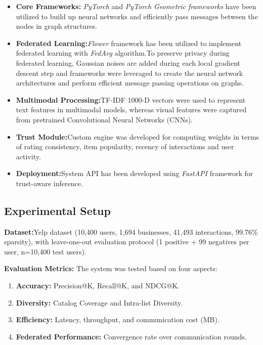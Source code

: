 \documentclass[journal]{IEEEtran} %
\begin{document}
\begin{itemize}
    \item \textbf{Core Frameworks:}
    \textit{PyTorch} and \textit{PyTorch Geometric frameworks} have been utilized to build up neural networks and efficiently pass messages between the nodes in graph structures.
    \item \textbf{Federated Learning:}\textit{Flower} framework has been utilized to implement federated learning with \textit{FedAvg} algorithm.To preserve privacy during federated learning, Gaussian noises are added during each local gradient descent step and  frameworks were leveraged to create the neural network architectures and perform efficient message passing operations on graphs.
    \item \textbf{Multimodal Processing:}TF-IDF 1000-D vectors were used to represent text features in multimodal models, whereas visual features were captured from pretrained Convolutional Neural Networks (CNNs).
    \item \textbf{Trust Module:}Custom engine was developed for computing weights in terms of rating consistency, item popularity, recency of interactions and user activity.
    \item \textbf{Deployment:}System API has been developed
    using \textit{FastAPI} framework for trust-aware inference.
    \end{itemize}

\subsection{Experimental Setup}

\textbf{Dataset:}Yelp dataset (10,400 users, 1,694 businesses, 41,493 interactions, 99.76\% sparsity), with leave-one-out evaluation protocol (1 positive + 99 negatives per user, n=10,400 test users).

\textbf{Evaluation Metrics:} The system was tested based on four aspects:
\begin{enumerate}
    \item \textbf{Accuracy:} Precision@K, Recall@K, and NDCG@K.
    \item \textbf{Diversity:} Catalog Coverage and Intra-list Diversity.
    \item \textbf{Efficiency:} Latency, throughput, and communication cost (MB).
    \item \textbf{Federated Performance:} Convergence rate over communication rounds.
\end{enumerate}
\end{document}
